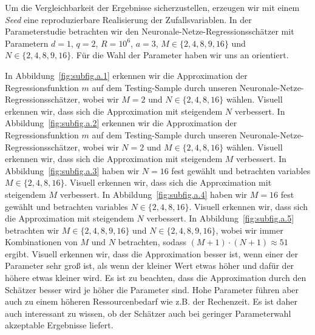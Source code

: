 Um die Vergleichbarkeit der Ergebnisse sicherzustellen, erzeugen wir mit einem \emph{Seed} eine reproduzierbare Realisierung der Zufallsvariablen. In der Parameterstudie betrachten wir den Neuronale-Netze-Regressionsschätzer mit Parametern $d = 1$, $q = 2$, $R = 10^6$, $a = 3$, $M \in\{2,4,8,9,16\}$ und $N \in \{2,4,8,9,16\}$. Für die Wahl der Parameter haben wir uns an \cite{kohler19} orientiert.

In Abbildung~\ref{fig:subfig.a.1} erkennen wir die Approximation der Regressionsfunktion $m$ auf dem Testing-Sample durch unseren Neuronale-Netze-Regressionsschätzer, wobei wir $M = 2$ und $N \in \{2,4,8,16\}$ wählen. Visuell erkennen wir, dass sich die Approximation mit steigendem $N$ verbessert.
In Abbildung~\ref{fig:subfig.a.2} erkennen wir die Approximation der Regressionsfunktion $m$ auf dem Testing-Sample durch unseren Neuronale-Netze-Regressionsschätzer, wobei wir $N = 2$ und $M \in \{2,4,8,16\}$ wählen. Visuell erkennen wir, dass sich die Approximation mit steigendem $M$ verbessert. In Abbildung~\ref{fig:subfig.a.3} haben wir $N = 16$ fest gewählt und betrachten variables $M \in \{2,4,8,16\}$. Visuell erkennen wir, dass sich die Approximation mit steigendem $M$ verbessert.
In Abbildung~\ref{fig:subfig.a.4} haben wir $M = 16$ fest gewählt und betrachten variables $N \in \{2,4,8,16\}$. Visuell erkennen wir, dass sich die Approximation mit steigendem $N$ verbessert.
In Abbildung~\ref{fig:subfig.a.5} betrachten wir $M \in \{2,4,8,9,16\}$ und $N \in \{2,4,8,9,16\}$, wobei wir immer Kombinationen von $M$ und $N$ betrachten, sodass $(M + 1)\cdot(N + 1) \approx 51$ ergibt. Visuell erkennen wir, dass die Approximation besser ist, wenn einer der Parameter sehr groß ist, als wenn der kleiner Wert etwas höher und dafür der höhere etwas kleiner wird. Es ist zu beachten, dass die Approximation durch den Schätzer besser wird je höher die Parameter sind. Hohe Parameter führen aber auch zu einem höheren Ressourcenbedarf wie z.B. der Rechenzeit. Es ist daher auch interessant zu wissen, ob der Schätzer auch bei geringer Parameterwahl akzeptable Ergebnisse liefert. 
